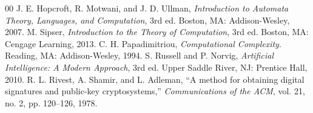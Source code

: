 \documentclass[conference]{IEEEtran}
\begin{document}
\begin{thebibliography}{00}
 J. E. Hopcroft, R. Motwani, and J. D. Ullman, \textit{Introduction to Automata Theory, Languages, and Computation}, 3rd ed. Boston, MA: Addison-Wesley, 2007.
 M. Sipser, \textit{Introduction to the Theory of Computation}, 3rd ed. Boston, MA: Cengage Learning, 2013.
 C. H. Papadimitriou, \textit{Computational Complexity}. Reading, MA: Addison-Wesley, 1994.
 S. Russell and P. Norvig, \textit{Artificial Intelligence: A Modern Approach}, 3rd ed. Upper Saddle River, NJ: Prentice Hall, 2010.
 R. L. Rivest, A. Shamir, and L. Adleman, ``A method for obtaining digital signatures and public-key cryptosystems,'' \textit{Communications of the ACM}, vol. 21, no. 2, pp. 120--126, 1978.
\end{thebibliography}
\end{document}
